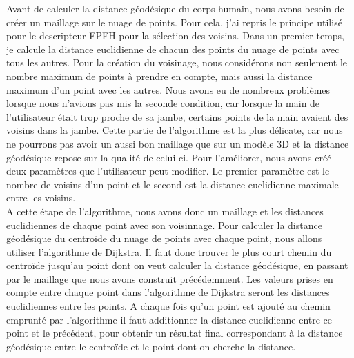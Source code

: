 Avant de calculer la distance géodésique du corps humain, nous avons besoin de créer un maillage sur le nuage de points. Pour cela,
j'ai repris le principe utilisé pour le descripteur FPFH\cite{FPFH} pour la sélection des voisins. Dans un premier temps, je calcule
la distance euclidienne de chacun des points du nuage de points avec tous les autres. Pour la création du voisinage, nous considérons non
seulement le nombre maximum de points à prendre en compte, mais aussi la distance maximum d'un point avec les autres. Nous avons eu
de nombreux problèmes lorsque nous n'avions pas mis la seconde condition, car lorsque la main de l'utilisateur était trop proche de sa 
jambe, certains points de la main avaient des voisins dans la jambe. Cette partie de l'algorithme est la plus délicate, car nous ne pourrons
pas avoir un aussi bon maillage que sur un modèle 3D et la distance géodésique repose sur la qualité de celui-ci. Pour l'améliorer, nous avons créé deux paramètres que l'utilisateur peut modifier. Le premier paramètre est le nombre de voisins d'un point et
le second est la distance euclidienne maximale entre les voisins.\\


A cette étape de l'algorithme, nous avons donc un maillage et les distances euclidiennes de chaque point avec son voisinnage. Pour calculer
la distance géodésique du centroïde du nuage de points avec chaque point, nous allons utiliser l'algorithme de Dijkstra\cite{dijkstra}.
Il faut donc trouver le plus court chemin du centroïde jusqu'au point dont on veut calculer la distance géodésique, en passant par le
maillage que nous avons construit précédemment. Les valeurs prises en compte entre chaque point dans l'algorithme de Dijkstra seront
les distances euclidiennes entre les points. A chaque fois qu'un point est ajouté au chemin emprunté par l'algorithme il faut 
additionner la distance euclidienne entre ce point et le précédent, pour obtenir un résultat final correspondant à la distance 
géodésique entre le centroïde et le point dont on cherche la distance.\\

